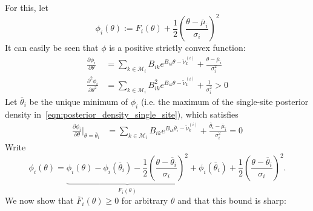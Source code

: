 \documentclass[11pt]{article}
\begin{document}
For this, let 
\begin{equation}
\phi_i(\theta) := F_i(\theta) + \frac{1}{2}\left(\frac{\theta-\overline{\mu}_i}{\sigma_i}\right)^2
\end{equation}
It can easily be seen that $\phi$ is a positive strictly convex function:
\begin{equation}
    \begin{aligned}
    \frac{\partial \phi_i}{\partial \theta} &=\sum_{k\in\mathcal{M}_i} B_{ik}e^{B_{ik} \theta -\widetilde{\nu}_k^{(i)}} + \frac{\theta-\overline{\mu}_i}{\sigma_i^2}\\
    \frac{\partial^2 \phi_i}{\partial \theta^2} &=\sum_{k\in\mathcal{M}_i} B_{ik}^2e^{B_{ik} \theta -\widetilde{\nu}_k^{(i)}} + \frac{1}{\sigma_i^2} > 0
    \end{aligned}
\end{equation}
Let $\overline{\theta}_i$ be the unique minimum of $\phi_i$ (i.e. the maximum of the single-site posterior density in~\eqref{eqn:posterior_density_single_site}), which satisfies
\begin{equation}
    \begin{aligned}
    \frac{\partial \phi_i}{\partial \theta}\Big|_{\theta=\overline{\theta}_i} &=\sum_{k\in\mathcal{M}_i} B_{ik}e^{B_{ik} \overline{\theta}_i -\widetilde{\nu}_k^{(i)}} + \frac{\overline{\theta}_i-\overline{\mu}_i}{\sigma_i^2} = 0
    \end{aligned}\label{eqn:mu_bar_definition}
\end{equation}
Write
\begin{equation}
\phi_i(\theta) = \underbrace{\phi_i(\theta)-\phi_i(\overline{\theta}_i)-\frac{1}{2}\left(\frac{\theta-\overline{\theta}_i}{\sigma_i}\right)^2}_{\overline{F}_i(\theta)} + \phi_i(\overline{\theta}_i)+\frac{1}{2}\left(\frac{\theta-\overline{\theta}_i}{\sigma_i}\right)^2.
\end{equation}
We now show that $\overline{F}_i(\theta)\ge0$ for arbitrary $\theta$ and that this bound is sharp:
\end{document}
